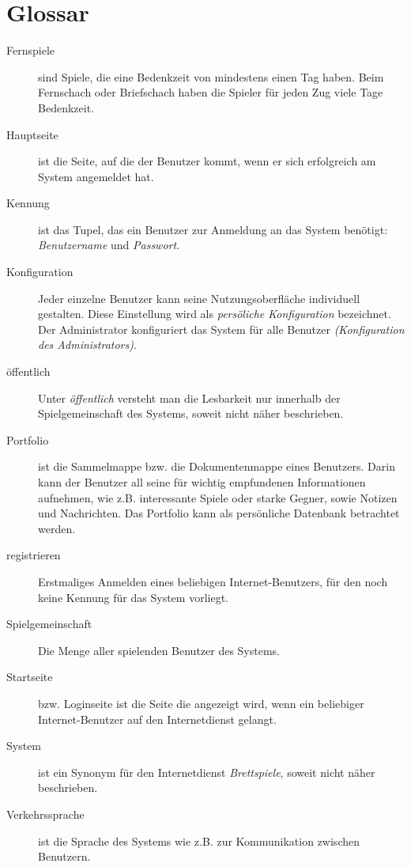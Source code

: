 \section{Glossar}


\begin{description}
  \item[Fernspiele]
    sind Spiele, die eine Bedenkzeit von mindestens einen Tag haben. Beim Fernschach oder Briefschach haben die Spieler für jeden
    Zug viele Tage Bedenkzeit.
  \item[Hauptseite]
    ist die Seite, auf die der Benutzer kommt, wenn er sich erfolgreich am System angemeldet hat.
  \item[Kennung]
    ist das Tupel, das ein Benutzer zur Anmeldung an das System benötigt: \textit{Benutzername} und \textit{Passwort}.
  \item[Konfiguration]
    Jeder einzelne Benutzer kann seine Nutzungsoberfläche individuell gestalten.
    Diese Einstellung wird als \textit{persöliche Konfiguration} bezeichnet.\\
    Der Administrator konfiguriert das System für alle Benutzer \textit{(Konfiguration des Administrators)}.
  \item[öffentlich]
    Unter \textit{öffentlich} versteht man die Lesbarkeit nur innerhalb der Spielgemeinschaft des Systems,
    soweit nicht näher beschrieben.
  \item[Portfolio]
    ist die Sammelmappe bzw. die Dokumentenmappe eines Benutzers.
    Darin kann der Benutzer all seine für wichtig empfundenen Informationen aufnehmen,
    wie z.B. interessante Spiele oder starke Gegner, sowie Notizen und Nachrichten.
    Das Portfolio kann als persönliche Datenbank betrachtet werden.
  \item[registrieren]
    Erstmaliges Anmelden eines beliebigen Internet-Benutzers, für den noch keine Kennung für das System vorliegt.
  \item[Spielgemeinschaft]
    Die Menge aller spielenden Benutzer des Systems.
  \item[Startseite]
    bzw. Loginseite ist die Seite die angezeigt wird, wenn ein beliebiger Internet-Benutzer auf den Internetdienst gelangt.
  \item[System]
    ist ein Synonym für den Internetdienst \textit{Brettspiele}, soweit nicht näher beschrieben.
  \item[Verkehrssprache]
    ist die Sprache des Systems wie z.B. zur Kommunikation zwischen Benutzern.
\end{description}
